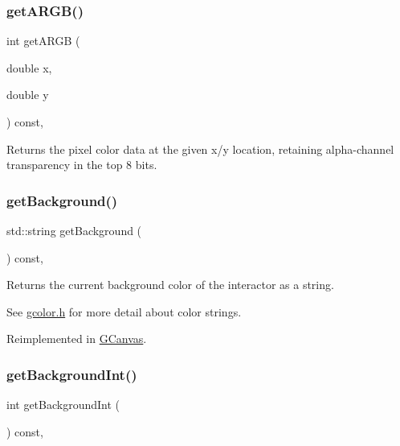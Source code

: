 \subsubsection{\texorpdfstring{get\+A\+R\+G\+B()}{getARGB()}}
{\footnotesize\ttfamily int get\+A\+R\+GB (\begin{DoxyParamCaption}\item[{double}]{x,  }\item[{double}]{y }\end{DoxyParamCaption}) const\hspace{0.3cm}{\ttfamily [virtual]}, {\ttfamily [inherited]}}



Returns the pixel color data at the given x/y location, retaining alpha-\/channel transparency in the top 8 bits. 

\mbox{\label{classGDrawingSurface_a808e22cc1fdfbecf71ed8c64ef4600e0}} 
\subsubsection{\texorpdfstring{get\+Background()}{getBackground()}}
{\footnotesize\ttfamily std\+::string get\+Background (\begin{DoxyParamCaption}{ }\end{DoxyParamCaption}) const\hspace{0.3cm}{\ttfamily [virtual]}, {\ttfamily [inherited]}}



Returns the current background color of the interactor as a string. 

See \mbox{\hyperlink{gcolor_8h_source}{gcolor.\+h}} for more detail about color strings. 

Reimplemented in \mbox{\hyperlink{classGCanvas_ab44f928b6bd7c8e4b82d5ed92bc3d4c6}{G\+Canvas}}.

\mbox{\label{classGDrawingSurface_a9e827257a55cb8cf4d9de2ec6bcfd7a0}} 
\subsubsection{\texorpdfstring{get\+Background\+Int()}{getBackgroundInt()}}
{\footnotesize\ttfamily int get\+Background\+Int (\begin{DoxyParamCaption}{ }\end{DoxyParamCaption}) const\hspace{0.3cm}{\ttfamily [virtual]}, {\ttfamily [inherited]}}




